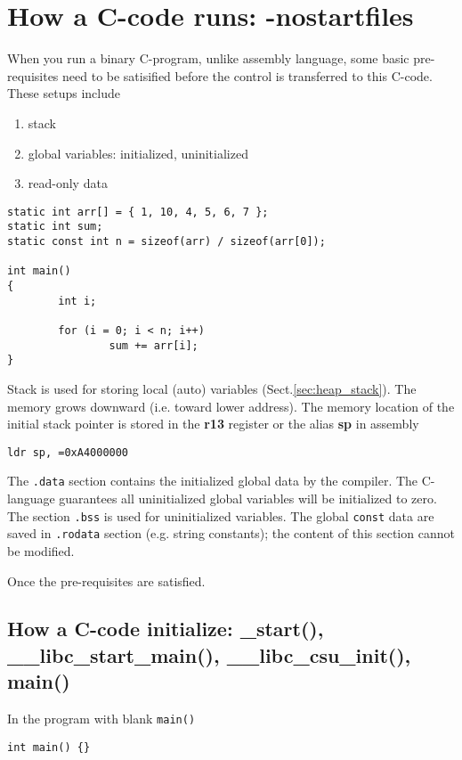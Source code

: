 \section{How a C-code runs: -nostartfiles}

When you run a binary C-program, unlike assembly language, some basic
pre-requisites need to be satisified before the control is transferred to this
C-code. These setups include
\begin{enumerate}
  \item stack
  \item global variables: initialized, uninitialized
  \item read-only data
\end{enumerate}

\begin{verbatim}
static int arr[] = { 1, 10, 4, 5, 6, 7 };
static int sum;
static const int n = sizeof(arr) / sizeof(arr[0]);

int main()
{
        int i;

        for (i = 0; i < n; i++)
                sum += arr[i];
}
\end{verbatim}

Stack is used for storing local (auto) variables (Sect.\ref{sec:heap_stack}).
The memory grows downward (i.e. toward lower address). The memory location of
the initial stack pointer is stored in the {\bf r13} register or the alias {\bf
sp} in assembly
\begin{verbatim}
ldr sp, =0xA4000000
\end{verbatim}
The \verb!.data! section contains the initialized global data by the compiler.
The C-language guarantees all uninitialized global variables will be initialized
to zero. The section \verb!.bss! is used for uninitialized variables. The
global \verb!const! data are saved in \verb!.rodata! section (e.g. string
constants); the content of this section cannot be modified.

Once the pre-requisites are satisfied.

\subsection{How a C-code initialize: \_start(), \_\_libc\_start\_main(), \_\_libc\_csu\_init(), main()}	
\label{sec:_start()}
\label{sec:__libc_start_main()}

In the program with blank \verb!main()!
\begin{verbatim}
int main() {}
\end{verbatim}

